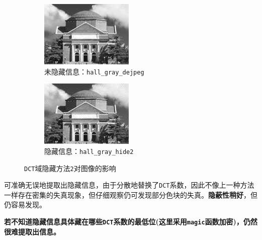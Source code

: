 \documentclass{article}
\numberwithin{figure}{section}
\numberwithin{table}{section}
\numberwithin{listing}{section}
\numberwithin{equation}{section}
\begin{document}
\begin{enumerate}
\begin{enumerate}
                        \begin{figure}[H]
                            \centering
                            \begin{subfigure}{0.5\textwidth}
                                \centering
                                \includegraphics[width=0.6\linewidth]{hall_gray_dejpeg}
                                \caption{未隐藏信息：\texttt{hall\_gray\_dejpeg}}
                            \end{subfigure}%
                            \begin{subfigure}{0.5\textwidth}
                                \centering
                                \includegraphics[width=0.6\linewidth]{hall_gray_hide2}
                                \caption{隐藏信息：\texttt{hall\_gray\_hide2}}
                            \end{subfigure}
                            \caption{\texttt{DCT}域隐藏方法\texttt{2}对图像的影响}
                        \end{figure}

                        可准确无误地提取出隐藏信息，由于分散地替换了\texttt{DCT}系数，因此不像上一种方法一样存在密集的失真现象，但仔细观察仍可发现部分色块的失真。\textbf{隐蔽性稍好}，但仍容易发现。

                        \textbf{若不知道隐藏信息具体藏在哪些\texttt{DCT}系数的最低位(这里采用\texttt{magic}函数加密)，仍然很难提取出信息。}


\end{enumerate}
\end{enumerate}
\end{document}

